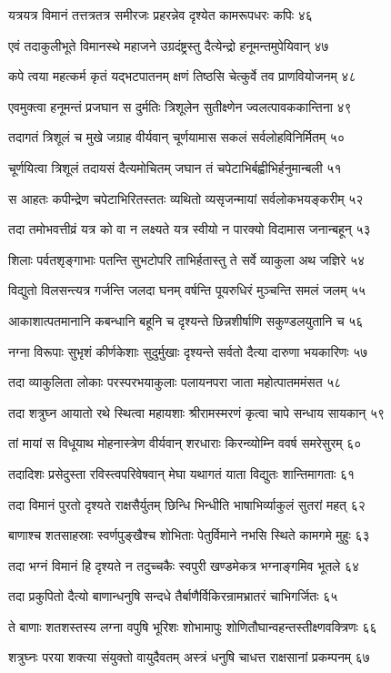 यत्रयत्र विमानं तत्तत्रतत्र समीरजः
प्रहरन्नेव दृश्येत कामरूपधरः कपिः ४६

एवं तदाकुलीभूते विमानस्थे महाजने
उग्रदंष्ट्रस्तु दैत्येन्द्रो हनूमन्तमुपेयिवान् ४७

कपे त्वया महत्कर्म कृतं यद्भटपातनम्
क्षणं तिष्ठसि चेत्कुर्वे तव प्राणवियोजनम् ४८

एवमुक्त्वा हनूमन्तं प्रजघान स दुर्मतिः
त्रिशूलेन सुतीक्ष्णेन ज्वलत्पावककान्तिना ४९

तदागतं त्रिशूलं च मुखे जग्राह वीर्यवान्
चूर्णयामास सकलं सर्वलोहविनिर्मितम् ५०

चूर्णयित्वा त्रिशूलं तदायसं दैत्यमोचितम्
जघान तं चपेटाभिर्बह्वीभिर्हनुमान्बली ५१

स आहतः कपीन्द्रेण चपेटाभिरितस्ततः
व्यथितो व्यसृजन्मायां सर्वलोकभयङ्करीम् ५२

तदा तमोभवत्तीव्रं यत्र को वा न लक्ष्यते
यत्र स्वीयो न पारक्यो विदामास जनान्बहून् ५३

शिलाः पर्वतशृङ्गाभाः पतन्ति सुभटोपरि
ताभिर्हतास्तु ते सर्वे व्याकुला अथ जज्ञिरे ५४

विद्युतो विलसन्त्यत्र गर्जन्ति जलदा घनम्
वर्षन्ति पूयरुधिरं मुञ्चन्ति समलं जलम् ५५

आकाशात्पतमानानि कबन्धानि बहूनि च
दृश्यन्ते छिन्नशीर्षाणि सकुण्डलयुतानि च ५६

नग्ना विरूपाः सुभृशं कीर्णकेशाः सुदुर्मुखाः
दृश्यन्ते सर्वतो दैत्या दारुणा भयकारिणः ५७

तदा व्याकुलिता लोकाः परस्परभयाकुलाः
पलायनपरा जाता महोत्पातममंसत ५८

तदा शत्रुघ्न आयातो रथे स्थित्वा महायशाः
श्रीरामस्मरणं कृत्वा चापे सन्धाय सायकान् ५९

तां मायां स विधूयाथ मोहनास्त्रेण वीर्यवान्
शरधाराः किरन्व्योम्नि ववर्ष समरेसुरम् ६०

तदादिशः प्रसेदुस्ता रविस्त्वपरिवेषवान्
मेघा यथागतं याता विद्युतः शान्तिमागताः ६१

तदा विमानं पुरतो दृश्यते राक्षसैर्युतम्
छिन्धि भिन्धीति भाषाभिर्व्याकुलं सुतरां महत् ६२

बाणाश्च शतसाहस्राः स्वर्णपुङ्खैश्च शोभिताः
पेतुर्विमाने नभसि स्थिते कामगमे मुहुः ६३

तदा भग्नं विमानं हि दृश्यते न तदुच्चकैः
स्वपुरी खण्डमेकत्र भग्नाङ्गमिव भूतले ६४

तदा प्रकुपितो दैत्यो बाणान्धनुषि सन्दधे
तैर्बाणैर्विकिरन्रामभ्रातरं चाभिगर्जितः ६५

ते बाणाः शतशस्तस्य लग्ना वपुषि भूरिशः
शोभामापुः शोणितौघान्वहन्तस्तीक्ष्णवक्त्रिणः ६६

शत्रुघ्नः परया शक्त्या संयुक्तो वायुदैवतम्
अस्त्रं धनुषि चाधत्त राक्षसानां प्रकम्पनम् ६७

